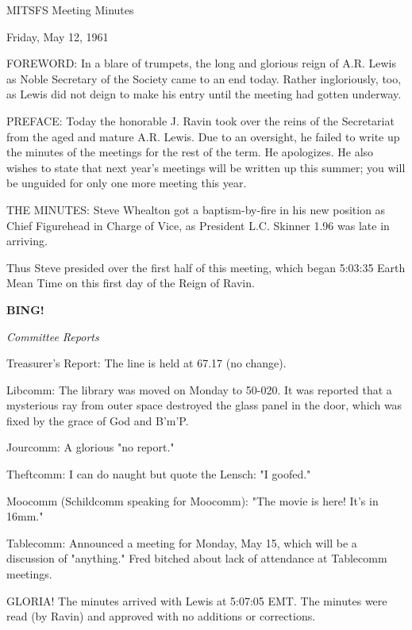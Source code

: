 \documentclass[12pt]{article}
\newcommand{\bing}{{\bf BING!} }
\newcommand{\goto}[1]{\bing \vskip 12pt \centerline{{\em{#1}}}}
\begin{document}
\begin{center}

MITSFS Meeting Minutes

Friday, May 12, 1961

\end{center}
 
\vspace{12pt}

\setlength{\parskip}{6pt}

\noindent
FOREWORD: In a blare of trumpets, the long and glorious reign of A.R. Lewis as Noble Secretary of the Society came to an end today. Rather ingloriously, too, as Lewis did not deign to make his entry until the meeting had gotten underway.

PREFACE: Today the honorable J. Ravin took over the reins of the Secretariat from the aged and mature A.R. Lewis. Due to an oversight, he failed to write up the minutes of the meetings for the rest of the term. He apologizes. He also wishes to state that next year's meetings will be written up this summer; you will be unguided for only one more meeting this year.

THE MINUTES: Steve Whealton got a baptism-by-fire in his new position as Chief Figurehead in Charge of Vice, as President L.C. Skinner 1.96 was late in arriving.

Thus Steve presided over the first half of this meeting, which began 5:03:35 Earth Mean Time on this first day of the Reign of Ravin.

\goto{Committee Reports}

Treasurer's Report: The line is held at 67.17 (no change).

Libcomm: The library was moved on Monday to 50-020. It was reported that a mysterious ray from outer space destroyed the glass panel in the door, which was fixed by the grace of God and B'm'P.

Jourcomm: A glorious "no report."

Theftcomm: I can do naught but quote the Lensch: "I goofed."

Moocomm (Schildcomm speaking for Moocomm): "The movie is here! It's in 16mm."

Tablecomm: Announced a meeting for Monday, May 15, which will be a discussion of "anything." Fred bitched about lack of attendance at Tablecomm meetings.

GLORIA! The minutes arrived with Lewis at 5:07:05 EMT. The minutes were read (by Ravin) and approved with no additions or corrections.
\end{document}
